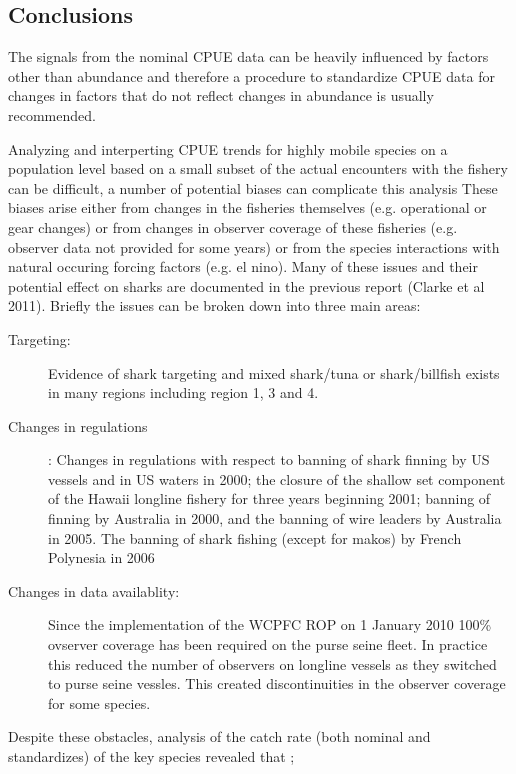       


      
\clearpage     







\subsection{Conclusions}
The signals from the nominal  CPUE data can be heavily influenced by factors other than abundance and therefore a procedure to standardize CPUE data for changes in factors  that do not reflect changes in abundance is usually recommended. 

 
Analyzing and interperting CPUE trends for highly mobile species on a population level based on a small subset of the actual encounters with the fishery can be difficult, a number of potential biases can complicate this analysis   These biases arise either from changes in the fisheries themselves (e.g. operational or gear changes) or from changes in observer coverage of these fisheries (e.g. observer data not provided for some years) or from the species interactions with natural occuring forcing factors (e.g. el nino).  Many of these issues and their potential effect on sharks are documented in the previous report (Clarke et al 2011). Briefly the issues can be broken down into three main areas:
\begin{description}
\item[Targeting:] Evidence of shark targeting and mixed shark/tuna or shark/billfish  exists in many regions including region 1, 3 and 4. 
\item[Changes in regulations]: Changes in regulations with respect to banning of shark finning by US vessels and in US waters in 2000; the closure of the shallow set component of the Hawaii longline fishery for three years beginning 2001; banning of  finning by Australia in 2000, and the banning of wire leaders by Australia in 2005. The banning of shark fishing (except for makos) by French Polynesia in 2006
\item[Changes in data availablity:] Since the implementation of the WCPFC ROP on 1 January 2010 100\% ovserver coverage has been required on the purse seine fleet. In practice this reduced the number of observers on longline vessels as they switched to purse seine vessles. This created discontinuities in the observer coverage for some species.
\end{description}
Despite these obstacles, analysis of the catch rate (both nominal and standardizes) of the key species revealed that ;

